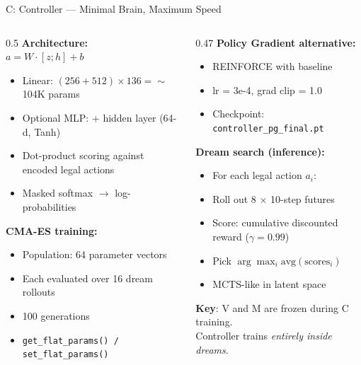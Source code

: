 \documentclass[aspectratio=169, 10pt]{beamer}
\begin{document}
\begin{frame}{C: Controller --- Minimal Brain, Maximum Speed}
  \begin{columns}[T]
    \begin{column}{0.5\textwidth}
      \footnotesize
      \textbf{Architecture:}\\
      $a = W \cdot [z; h] + b$
      \begin{itemize}\scriptsize
        \item Linear: $(256 + 512) \times 136 = \sim$104K params
        \item Optional MLP: + hidden layer (64-d, Tanh)
        \item Dot-product scoring against encoded legal actions
        \item Masked softmax $\to$ log-probabilities
      \end{itemize}
      \vspace{0.15cm}
      \textbf{CMA-ES training:}
      \begin{itemize}\scriptsize
        \item Population: 64 parameter vectors
        \item Each evaluated over 16 dream rollouts
        \item 100 generations
        \item \texttt{get\_flat\_params() / set\_flat\_params()}
      \end{itemize}
    \end{column}
    \begin{column}{0.47\textwidth}
      \footnotesize
      \textbf{Policy Gradient alternative:}
      \begin{itemize}\scriptsize
        \item REINFORCE with baseline
        \item lr = 3e-4, grad clip = 1.0
        \item Checkpoint: \texttt{controller\_pg\_final.pt}
      \end{itemize}
      \vspace{0.15cm}
      \textbf{Dream search (inference):}
      \begin{itemize}\scriptsize
        \item For each legal action $a_i$:
        \item Roll out 8 $\times$ 10-step futures
        \item Score: cumulative discounted reward ($\gamma = 0.99$)
        \item Pick $\arg\max_i \text{avg}(\text{scores}_i)$
        \item MCTS-like in latent space
      \end{itemize}
      \vspace{0.15cm}
      \textbf{Key}: V and M are frozen during C training.\\
      Controller trains \textit{entirely inside dreams}.
    \end{column}
  \end{columns}
\end{frame}
\end{document}
